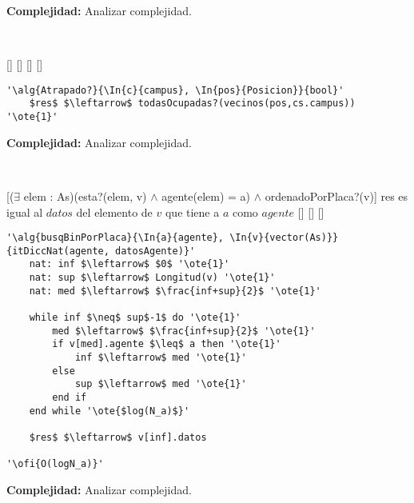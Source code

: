 \textbf{Complejidad:} Analizar complejidad.

~


[]
{}
[]
[]
[]

\begin{lstlisting}[mathescape]
'\alg{Atrapado?}{\In{c}{campus}, \In{pos}{Posicion}}{bool}'
	$res$ $\leftarrow$ todasOcupadas?(vecinos(pos,cs.campus)) '\ote{1}'
\end{lstlisting}

\textbf{Complejidad:} Analizar complejidad.

~


[($\exists$ elem : As)(esta?(elem, v) $\land$ agente(elem) = a) $\land$ ordenadoPorPlaca?(v)]
{res es igual al $datos$ del elemento de $v$ que tiene a $a$ como $agente$}
[]
[]
[]

\begin{lstlisting}[mathescape]
'\alg{busqBinPorPlaca}{\In{a}{agente}, \In{v}{vector(As)}}{itDiccNat(agente, datosAgente)}'
	nat: inf $\leftarrow$ $0$ '\ote{1}'
	nat: sup $\leftarrow$ Longitud(v) '\ote{1}'
	nat: med $\leftarrow$ $\frac{inf+sup}{2}$ '\ote{1}'

	while inf $\neq$ sup$-1$ do '\ote{1}'
		med $\leftarrow$ $\frac{inf+sup}{2}$ '\ote{1}'
		if v[med].agente $\leq$ a then '\ote{1}'
			inf $\leftarrow$ med '\ote{1}'
		else
			sup $\leftarrow$ med '\ote{1}'
		end if
	end while '\ote{$log(N_a)$}'

	$res$ $\leftarrow$ v[inf].datos

'\ofi{O(logN_a)}'
\end{lstlisting}

\textbf{Complejidad:} Analizar complejidad.
